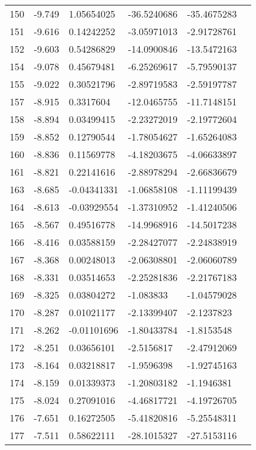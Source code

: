 \begin{longtable}{XXXXXX}
    150   & -9.749 & 1.05654025 & -36.5240686 & -35.4675283 &  \\
    151   & -9.616 & 0.14242252 & -3.05971013 & -2.91728761 &  \\
    152   & -9.603 & 0.54286829 & -14.0900846 & -13.5472163 &  \\
    154   & -9.078 & 0.45679481 & -6.25269617 & -5.79590137 &  \\
    155   & -9.022 & 0.30521796 & -2.89719583 & -2.59197787 &  \\
    157   & -8.915 & 0.3317604 & -12.0465755 & -11.7148151 &  \\
    158   & -8.894 & 0.03499415 & -2.23272019 & -2.19772604 &  \\
    159   & -8.852 & 0.12790544 & -1.78054627 & -1.65264083 &  \\
    160   & -8.836 & 0.11569778 & -4.18203675 & -4.06633897 &  \\
    161   & -8.821 & 0.22141616 & -2.88978294 & -2.66836679 &  \\
    163   & -8.685 & -0.04341331 & -1.06858108 & -1.11199439 &  \\
    164   & -8.613 & -0.03929554 & -1.37310952 & -1.41240506 &  \\
    165   & -8.567 & 0.49516778 & -14.9968916 & -14.5017238 &  \\
    166   & -8.416 & 0.03588159 & -2.28427077 & -2.24838919 &  \\
    167   & -8.368 & 0.00248013 & -2.06308801 & -2.06060789 &  \\
    168   & -8.331 & 0.03514653 & -2.25281836 & -2.21767183 &  \\
    169   & -8.325 & 0.03804272 & -1.083833 & -1.04579028 &  \\
    170   & -8.287 & 0.01021177 & -2.13399407 & -2.1237823 &  \\
    171   & -8.262 & -0.01101696 & -1.80433784 & -1.8153548 &  \\
    172   & -8.251 & 0.03656101 & -2.5156817 & -2.47912069 &  \\
    173   & -8.164 & 0.03218817 & -1.9596398 & -1.92745163 &  \\
    174   & -8.159 & 0.01339373 & -1.20803182 & -1.1946381 &  \\
    175   & -8.024 & 0.27091016 & -4.46817721 & -4.19726705 &  \\
    176   & -7.651 & 0.16272505 & -5.41820816 & -5.25548311 &  \\
    177   & -7.511 & 0.58622111 & -28.1015327 & -27.5153116 &  \\

\end{longtable}
